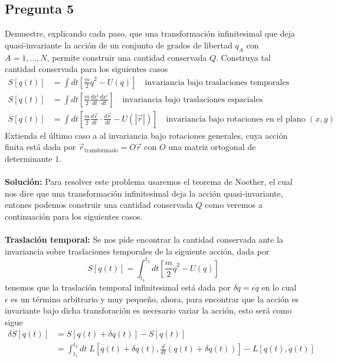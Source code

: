 \documentclass[../main.tex]{subfiles}
\begin{document}
\subsection{Pregunta 5}
Demuestre, explicando cada paso, que una transformación infinitesimal que deja quasi-invariante la acción de un conjunto de grados de libertad $q_A$ con $A=1,\dots ,N$, permite construir una cantidad conservada $Q$. Construya tal cantidad conservada para los siguientes casos
\begin{align*}
  S[q(t)] & = \int dt \left[\frac{m}{2}{\dot{q}}^2 - U(q) \right] \quad \text{invariancia bajo traslaciones temporales} \\ 
  S[q(t)] & = \int dt \left[ \frac{m}{2}\frac{dx^i}{dt}\frac{dx^i}{dt}\right] \quad \text{invariancia bajo traslaciones espaciales} \\
  S[q(t)] & = \int dt \left[  \frac{m}{2}\frac{d\vec{r}}{dt}\cdot \frac{d\vec{r}}{dt}-U(|\vec{r}|)\right] \quad \text{invariancia bajo rotaciones en el plano }(x,y)
\end{align*}
Extienda el último caso a al invariancia bajo rotaciones generales, cuya acción finita está dada por $\vec{r}_{\text{transformado}}=O\vec{r}$ con $O$ una matriz ortogonal de determinante $1$. \\
\\
\textbf{Solución:}
Para resolver este problema usaremos el  teorema de Noether, el cual nos dice que una transformación infinitesimal deja la acción quasi-invariante, entones podemos construir una cantidad conservada $Q$ como veremos a continuación para los siguientes casos. \\
\\
\textbf{Traslación temporal:} Se nos pide encontrar la cantidad conservada ante la invariancia sobre traslaciones temporales de la siguiente acción, dada por
\begin{equation*}
  S[q(t)] = \int_{t_1}^{t_2} dt \left[ \frac{m}{2}\dot{q}^2 - U(q) \right]
\end{equation*}
tenemos que la traslación temporal infinitesimal está dada por $\delta q = \epsilon \dot{q}$ en lo cual $\epsilon$ es un término arbitrario y muy pequeño, ahora, para encontrar que la acción es invariante bajo dicha transforación es necesario variar la acción, esto será como sigue
\begin{align*}
  \delta S[q(t)]  & = S[q(t)+\delta q(t)] - S[q(t)] \\
  & = \int_{t_1}^{t_2}dt \; L[q(t)+\delta q(t), \frac{d}{dt}(q(t)+\delta q(t))] - L[q(t),\dot{q}(t)]
\end{align*}
\end{document}
